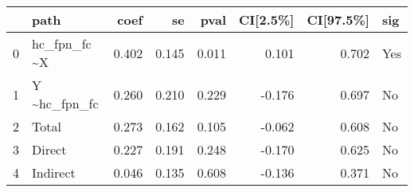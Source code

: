 \begin{tabular}{llrrrrrl}
\toprule
{} &           path &   coef &     se &   pval &  CI[2.5\%] &  CI[97.5\%] &  sig \\
\midrule
0 &  hc\_fpn\_fc \textasciitilde  X &  0.402 &  0.145 &  0.011 &     0.101 &      0.702 &  Yes \\
1 &  Y \textasciitilde  hc\_fpn\_fc &  0.260 &  0.210 &  0.229 &    -0.176 &      0.697 &   No \\
2 &          Total &  0.273 &  0.162 &  0.105 &    -0.062 &      0.608 &   No \\
3 &         Direct &  0.227 &  0.191 &  0.248 &    -0.170 &      0.625 &   No \\
4 &       Indirect &  0.046 &  0.135 &  0.608 &    -0.136 &      0.371 &   No \\
\bottomrule
\end{tabular}
